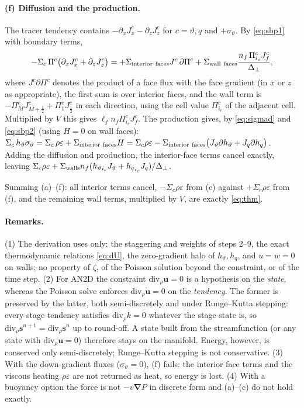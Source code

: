 \documentclass[11pt,a4paper]{article}
\newcommand{\vt}{\vartheta}                    %
\newcommand{\hth}{{h_{\vartheta}}}               %
\newcommand{\hq}{{h_q}}                          %
\newcommand{\bnabla}{\boldsymbol{\nabla}}
\begin{document}
\paragraph{(f) Diffusion and the production.} The tracer tendency contains $-\partial_xJ^c_x-\partial_zJ^c_z$ for $c=\vt,q$ and $+\sigma_\vt$. By \eqref{eq:sbp1} with boundary terms,
\begin{equation}
  -\Sigma_c\,\Pi^c\big(\partial_xJ^c_x+\partial_zJ^c_z\big)=+\Sigma_{\rm interior\ faces}J^c\,\partial\Pi^c+\Sigma_{\rm wall\ faces}\frac{n_f\,\Pi^c_{i_c}J^c_f}{\Delta_\perp},
\end{equation}
where $J^c\partial\Pi^c$ denotes the product of a face flux with the face gradient (in $x$ or $z$ as appropriate), the first sum is over interior faces, and the wall term is $-\Pi^c_{M}J^c_{M+\frac12}+\Pi^c_1J^c_{\frac12}$ in each direction, using the cell value $\Pi^c_{i_c}$ of the adjacent cell. Multiplied by $V$ this gives $\ell_fn_f\Pi^c_{i_c}J^c_f$.
The production gives, by \eqref{eq:sigmad} and \eqref{eq:sbp2} (using $H=0$ on wall faces): $\Sigma_c\,\hth\sigma_\vt=\Sigma_c\,\rho\varepsilon+\Sigma_{\rm interior\ faces}H=\Sigma_c\rho\varepsilon-\Sigma_{\rm interior\ faces}\big(J_\vt\partial\hth+J_q\partial\hq\big)$.
Adding the diffusion and production, the interior-face terms cancel exactly, leaving $\Sigma_c\rho\varepsilon+\Sigma_{\rm walls}n_f(\hth_{i_c}J_\vt+\hq_{i_c}J_q)/\Delta_\perp$.

Summing (a)--(f): all interior terms cancel, $-\Sigma_c\rho\varepsilon$ from (e) against $+\Sigma_c\rho\varepsilon$ from (f), and the remaining wall terms, multiplied by $V$, are exactly \eqref{eq:thm}.

\paragraph{Remarks.} (1) The derivation uses only: the staggering and weights of steps 2--9, the exact thermodynamic relations \eqref{eq:dU}, the zero-gradient halo of $\hth,\hq$, and $u=w=0$ on walls; no property of $\zeta$, of the Poisson solution beyond the constraint, or of the time step.
(2) For AN2D the constraint $\mathrm{div}_\rho\mathbf u=0$ is a hypothesis on the \emph{state}, whereas the Poisson solve enforces $\mathrm{div}_\rho\dot{\mathbf u}=0$ on the \emph{tendency}. The former is preserved by the latter, both semi-discretely and under Runge--Kutta stepping:
every stage tendency satisfies $\mathrm{div}_\rho k=0$ whatever the stage state is, so $\mathrm{div}_\rho\mathbf s^{n+1}=\mathrm{div}_\rho\mathbf s^n$ up to round-off. A state built from the streamfunction (or any state with $\mathrm{div}_\rho\mathbf u=0$) therefore stays on the manifold. Energy, however, is conserved only semi-discretely; Runge--Kutta stepping is not conservative.
(3) With the down-gradient fluxes ($\sigma_\vt=0$), (f) fails: the interior face terms and the viscous heating $\rho\varepsilon$ are not returned as heat, so energy is lost.
(4) With a buoyancy option the force is not $-v\bnabla P$ in discrete form and (a)--(c) do not hold exactly.
\end{document}
